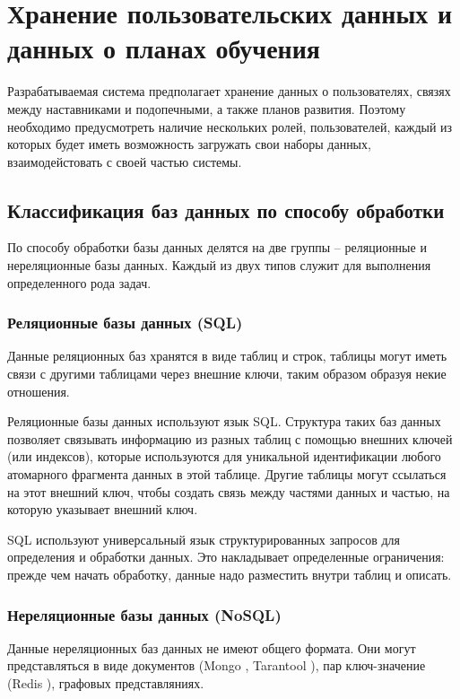\section{Хранение пользовательских данных и данных о планах обучения}

Разрабатываемая система предполагает хранение данных о пользователях, связях между наставниками и подопечными, а также планов развития.
Поэтому необходимо предусмотреть наличие нескольких ролей, пользователей, каждый из которых будет
иметь возможность загружать свои наборы данных, взаимодейстовать с своей частью системы.

\subsection{Классификация баз данных по способу обработки}

По способу обработки базы данных делятся на две группы -- реляционные и нереляционные базы данных. Каждый из двух типов служит для выполнения определенного рода задач.

\subsubsection{Реляционные базы данных (SQL)}

Данные реляционных баз хранятся в виде таблиц и строк, таблицы могут иметь связи с другими таблицами через внешние ключи, таким образом образуя некие отношения.

Реляционные базы данных используют язык SQL. Структура таких баз данных позволяет связывать информацию из разных таблиц с помощью внешних ключей (или индексов), которые используются для уникальной идентификации любого атомарного фрагмента данных в этой таблице. Другие таблицы могут ссылаться на этот внешний ключ, чтобы создать связь между частями данных и частью, на которую указывает внешний ключ.

SQL используют универсальный язык структурированных запросов для определения и обработки данных. Это накладывает определенные ограничения: прежде чем начать обработку, данные надо разместить внутри таблиц и описать.

\subsubsection{Нереляционные базы данных (NoSQL)}

Данные нереляционных баз данных не имеют общего формата. Они могут представляться в виде документов (Mongo \cite{mongodb}, Tarantool \cite{tarantool}), пар ключ-значение (Redis \cite{redis}), графовых представляниях.

